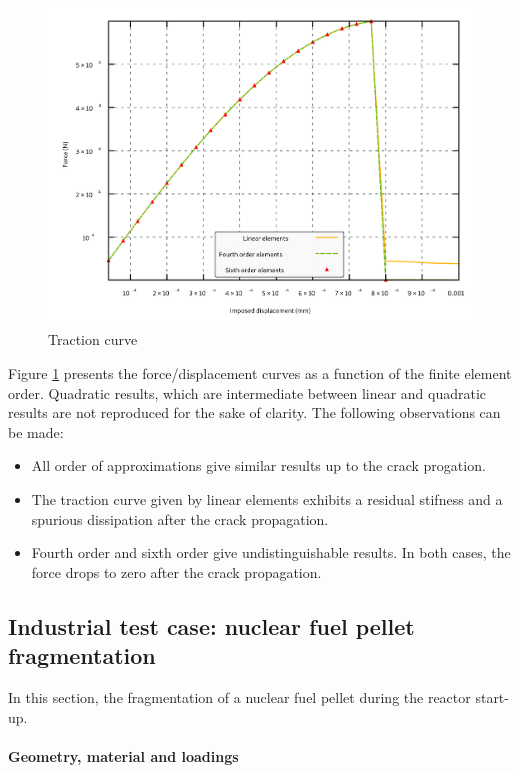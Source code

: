 \begin{figure}[H]
  \centering
  \includegraphics[width=10.cm]{../chapter_003_ef_micromorphic/figures/shear-driven-fracture-damage-results-force.pdf}
  \caption{Traction curve}
  \label{fig:micromorphicdamage:traction_curve}
\end{figure}

Figure \ref{fig:micromorphicdamage:traction_curve} presents the
force/displacement curves as a function of the finite element order.
Quadratic results, which are intermediate between linear and quadratic
results are not reproduced for the sake of clarity. The following
observations can be made:

\begin{itemize}
  \item All order of approximations give similar results up to the crack
  progation.
  \item The traction curve given by linear elements exhibits a residual
  stifness and a spurious dissipation after the crack propagation.
  \item Fourth order and sixth order give undistinguishable results. In both
  cases, the force drops to zero after the crack propagation.
\end{itemize}

\subsection{Industrial test case: nuclear fuel pellet fragmentation}

In this section, the fragmentation of a nuclear fuel pellet during the
reactor start-up. 

\paragraph{Geometry, material and loadings}

